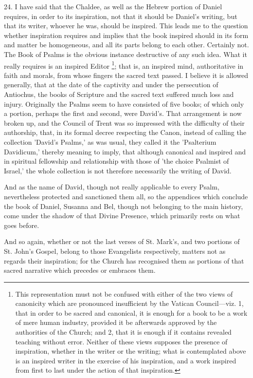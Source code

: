 24. I have said that the Chaldee, as well as the
Hebrew portion of Daniel requires, in order to its inspiration, not
that it should be Daniel's writing, but that its writer, whoever he
was, should be inspired. This leads me to the question whether
inspiration requires and implies that the book inspired should in its
form and matter be homogeneous, and all its parts belong to each
other. Certainly not. The Book of Psalms is the obvious instance
destructive of any such idea. What it really requires is an inspired
Editor \footnote{This representation must not be confused with either of the two views
of canonicity which are pronounced insufficient by the Vatican
Council—viz. 1, that in order to be sacred and canonical, it is
enough for a book to be a work of mere human industry, provided it be
afterwards approved by the authorities of the Church; and 2, that it
is enough if it contains revealed teaching without error. Neither of
these views supposes the presence of inspiration, whether in the
writer or the writing; what is contemplated above is an inspired
writer in the exercise of his inspiration, and a work inspired from
first to last under the action of that inspiration.}; that is, an inspired mind, authoritative in faith and morals, from whose fingers
the sacred text passed. I believe it is allowed generally, that at the
date of the captivity and under the persecution of Antiochus, the
books of Scripture and the sacred text suffered much loss and injury.
Originally the Psalms seem to have consisted of five books; of which
only a portion, perhaps the first and second, were David's. That
arrangement is now broken up, and the Council of Trent was so
impressed with the difficulty of their authorship, that, in its formal
decree respecting the Canon, instead of calling the collection 'David's
Psalms,' as was usual, they called it the 'Psalterium Davidicum,'
thereby meaning to imply, that although canonical and inspired and in
spiritual fellowship and relationship with those of 'the choice
Psalmist of Israel,' the whole collection is not therefore necessarily
the writing of David.

And as the name of David, though not really
applicable to every Psalm, nevertheless protected and sanctioned them
all, so the appendices which conclude the book of Daniel, Susanna and
Bel, though not belonging to the main history, come under the shadow
of that Divine Presence, which primarily rests on what goes before.

And so again, whether or not the last verses of
St. Mark's, and two portions of St. John's Gospel, belong to those
Evangelists respectively, matters not as regards their inspiration;
for the Church has recognised them as portions of that sacred
narrative which precedes or embraces them.

